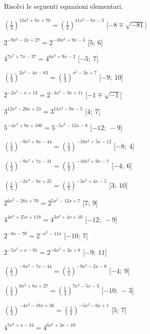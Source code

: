 \begin{esercizio}\label{ese:}
 Risolvi le seguenti equazioni elementari.
 \begin{enumeratea}
  \item  \(\left(\frac{1}{2}\right)^{12 x^2 +8 x +70} = 
\left(\frac{1}{2}\right)^{11 x^2 -8 x -3}\)
   \hfill [\(-8 \mp \sqrt{-81}\)]
  \item  \(2^{-9 x^2 -2 x +27} = 2^{-10 x^2 +9 x -3}\)
   \hfill [\(5;~6\)]
  \item  \(4^{7 x^2 +7 x -37} = 4^{6 x^2 +9 x -2}\)
   \hfill [\(-5;~7\)]
  \item  \(\left(\frac{1}{3}\right)^{2 x^2 -4 x -83} = 
\left(\frac{1}{3}\right)^{x^2 -3 x +7}\)
   \hfill [\(-9;~10\)]
  \item  \(2^{-2 x^2 - x +13} = 2^{-3 x^2 -3 x +11}\)
   \hfill [\(-1 \mp \sqrt{-1}\)]
  \item  \(3^{12 x^2 -20 x +23} = 3^{11 x^2 -9 x -5}\)
   \hfill [\(4;~7\)]
  \item  \(5^{-4 x^2 +9 x +100} = 5^{-5 x^2 -12 x -8}\)
   \hfill [\(-12;~-9\)]
  \item  \(\left(\frac{1}{3}\right)^{-9 x^2 +9 x -44} = 
\left(\frac{1}{3}\right)^{-10 x^2 +5 x -12}\)
   \hfill [\(-8;~4\)]
  \item  \(\left(\frac{1}{2}\right)^{-9 x^2 +7 x -31} = 
\left(\frac{1}{2}\right)^{-10 x^2 +9 x -7}\)
   \hfill [\(-4;~6\)]
  \item  \(\left(\frac{1}{5}\right)^{-2 x^2 -9 x +25} = 
\left(\frac{1}{5}\right)^{-3 x^2 +4 x -5}\)
   \hfill [\(3;~10\)]
  \item  \(2^{6 x^2 -28 x +70} = 2^{5 x^2 -12 x +7}\)
   \hfill [\(7;~9\)]
  \item  \(4^{4 x^2 +25 x +118} = 4^{3 x^2 +4 x +10}\)
   \hfill [\(-12;~-9\)]
  \item  \(2^{-8 x -70} = 2^{- x^2 -11 x }\)
   \hfill [\(-10;~7\)]
  \item  \(2^{-5 x^2 + x -91} = 2^{-6 x^2 +3 x +8}\)
   \hfill [\(-9;~11\)]
  \item  \(\left(\frac{1}{5}\right)^{-8 x^2 -7 x -44} = 
\left(\frac{1}{5}\right)^{-9 x^2 -2 x -8}\)
   \hfill [\(-4;~9\)]
  \item  \(\left(\frac{1}{4}\right)^{8 x^2 +8 x +27} = 
\left(\frac{1}{4}\right)^{7 x^2 -5 x -3}\)
   \hfill [\(-10;~-3\)]
  \item  \(\left(\frac{1}{2}\right)^{-4 x^2 -18 x +36} = 
\left(\frac{1}{2}\right)^{-5 x^2 -6 x +1}\)
   \hfill [\(5;~7\)]
  \item  \(4^{7 x^2 + x -34} = 4^{6 x^2 +3 x -10}\)

\end{enumeratea}
\end{esercizio}
